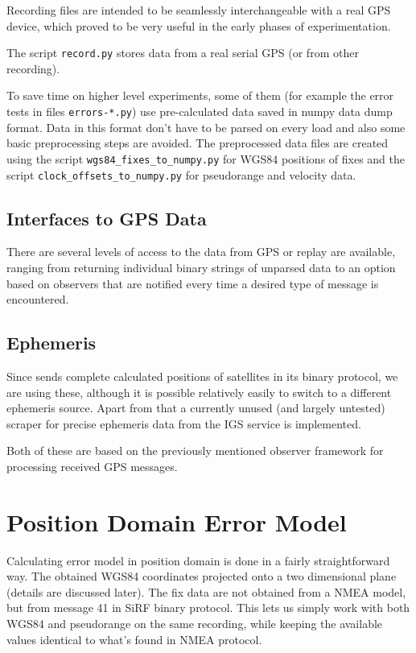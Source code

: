 Recording files are intended to be seamlessly interchangeable with a real GPS device,
which proved to be very useful in the early phases of experimentation.

The script \verb=record.py= stores data from a real serial GPS (or from other recording).

To save time on higher level experiments, some of them (for example the error tests
in files \verb=errors-*.py=)
use pre-calculated data saved in numpy data dump format.
Data in this format don't have to be parsed on every load and also some basic
preprocessing steps are avoided.
The preprocessed data files are created using the script \verb=wgs84_fixes_to_numpy.py=
for WGS84 positions of fixes and the script \verb=clock_offsets_to_numpy.py= for pseudorange
and velocity data.

\subsection{Interfaces to GPS Data}
There are several levels of access to the data from GPS or replay are available,
ranging from returning individual binary strings of unparsed data to an option based
on observers that are notified every time a desired type of message is encountered.

\subsection{Ephemeris}
Since \sirf sends complete calculated positions of satellites in its binary
protocol, we are using these, although it is possible relatively easily to switch
to a different ephemeris source.
Apart from that a currently unused (and largely untested) scraper for precise
ephemeris data from the IGS service \cite{orbit-data} is implemented.

Both of these are based on the previously mentioned observer framework for processing
received GPS messages.

\section{Position Domain Error Model}
Calculating error model in position domain is done in a fairly straightforward way.
The obtained WGS84 coordinates projected onto a two dimensional plane
(details are discussed later).
The fix data are not obtained from a NMEA model, but from message 41 in SiRF
binary protocol.
This lets us simply work with both WGS84 and pseudorange on the same recording,
while keeping the available values identical to what's found in NMEA protocol.


